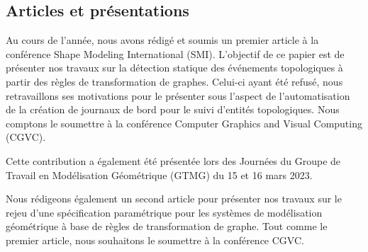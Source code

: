 \subsection{Articles et présentations}

Au cours de l'année, nous avons rédigé et soumis un premier article à la
conférence Shape Modeling International (SMI). %
L'objectif de ce papier est de présenter nos travaux sur la détection statique
des événements topologiques à partir des règles de transformation de graphes. %
Celui-ci ayant été refusé, nous retravaillons ses motivations pour le présenter
sous l'aspect de l'automatisation de la création de journaux de bord pour le
suivi d'entités topologiques. %
Nous comptons le soumettre à la conférence Computer Graphics and Visual
Computing (CGVC). %

Cette contribution a également été présentée lors des Journées du Groupe de
Travail en Modélisation Géométrique (GTMG) du 15 et 16 mars 2023. %

Nous rédigeons également un second article pour présenter nos travaux sur le
rejeu d'une spécification paramétrique pour les systèmes de modélisation
géométrique à base de règles de transformation de graphe. %
Tout comme le premier article, nous souhaitons le soumettre à la conférence
CGVC. %

